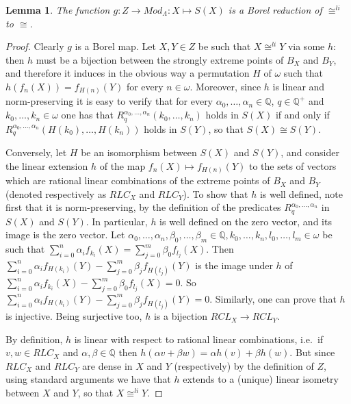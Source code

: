 \documentclass{amsart}
\newtheorem{lemma}[theorem]{Lemma}
\theoremstyle{definition}
\theoremstyle{remark}
\begin{document}
\begin{lemma}\label{lemmaliiso}
 The function $g \colon Z \to Mod_\Lambda \colon X \mapsto S(X)$ is a
 Borel reduction of $\cong^{li}$ to $\cong$.
\end{lemma}

\begin{proof}
 Clearly $g$ is a Borel map. Let $X,Y \in Z$ be such that $X
 \cong^{li} Y$ via some $h$: then $h$ must be a bijection between the
 strongly extreme points of $B_X$ and $B_Y$, and therefore it
 induces in the obvious way a permutation $H$ of $\omega$ such that
 $h(f_n(X)) = f_{H(n)}(Y)$ for every $n \in
 \omega$. Moreover, since $h$ is linear
 and norm-preserving it is
 easy to verify that for every $\alpha_0, \dotsc, \alpha_n \in {\mathbb{Q}}$, $q \in {\mathbb{Q}}^+$ and $k_0, \dotsc, k_n \in \omega$
 one has that $R^{ \alpha_0, \dotsc, \alpha_n}_q(k_0, \dotsc, k_n)$
 holds in $S(X)$ if and only if $R^{ \alpha_0, \dotsc,
   \alpha_n}_q(H(k_0), \dotsc, H(k_n))$ holds in $S(Y)$, so that $S(X)
 \cong S(Y)$.

Conversely, let $H$ be an isomorphism between $S(X)$ and $S(Y)$, and
consider the linear extension $h$ of the map $f_n(X) \mapsto
f_{H(n)}(Y)$ to the sets of vectors which are rational linear
combinations of the extreme points of $B_X$ and $B_Y$ (denoted
respectively as $RLC_X$ and $RLC_Y$). To show that $h$ is well
defined, note first that it is norm-preserving, by the definition of
the predicates $R^{\alpha_0, \dotsc, \alpha_n}_q$ in $S(X)$ and
$S(Y)$. In particular, $h$ is well defined on the zero vector, and
its image is the zero vector. Let $\alpha_0, \dotsc, \alpha_n,
\beta_0, \dotsc , \beta_m \in {\mathbb{Q}}, k_0, \dotsc, k_n, l_0, \dotsc, l_m
\in \omega$ be such that
$\sum_{i=0}^n\alpha_if_{k_i}(X)=\sum_{j=0}^m\beta_0 f_{l_j}(X)$. Then
$\sum_{i=0}^n\alpha_if_{H(k_i)}(Y)-\sum_{j=0}^m\beta_jf_{H(l_j)}(Y)$
is the image under $h$ of
$\sum_{i=0}^n\alpha_if_{k_i}(X)-\sum_{j=0}^m\beta_0 f_{l_j}(X)=0$. So
$\sum_{i=0}^n\alpha_if_{H(k_i)}(Y)-\sum_{j=0}^m\beta_jf_{H(l_j)}(Y)=0$.
Similarly, one can prove that $h$ is injective. Being surjective too,
$h$ is a bijection $RCL_X\to RCL_Y$.

By definition, $h$ is linear with
respect to rational linear combinations, i.e.\ if $v,w \in RLC_X$
and $\alpha, \beta \in {\mathbb{Q}}$ then $h(\alpha v + \beta w) = \alpha h(v)
+ \beta h(w)$. But since $RLC_X$ and $RLC_Y$ are dense in $X$ and $Y$
(respectively) by the definition of $Z$, using standard
arguments we have that
$h$ extends to a (unique) linear isometry between $X$ and $Y$, so that
$X \cong^{li} Y$.
\end{proof}
\end{document}
